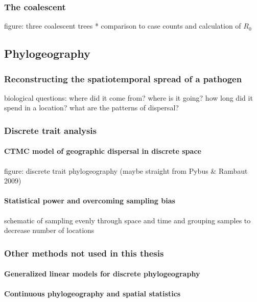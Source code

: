       \subsubsection{The coalescent}
      figure: three coalescent trees *
      comparison to case counts and calculation of $R_0$

    \subsection{Phylogeography}

      \subsubsection{Reconstructing the spatiotemporal spread of a pathogen}
      biological questions: where did it come from? where is it going? how long did it spend in a location? what are the patterns of dispersal?
      \subsubsection{Discrete trait analysis}

        \paragraph*{CTMC model of geographic dispersal in discrete space}
        figure: discrete trait phylogeography (maybe straight from Pybus \& Rambaut 2009)
        \paragraph*{Statistical power and overcoming sampling bias}
        schematic of sampling evenly through space and time and grouping samples to decrease number of locations

      \subsubsection{Other methods not used in this thesis}

        \paragraph*{Generalized linear models for discrete phylogeography}
        \paragraph*{Continuous phylogeography and spatial statistics}
